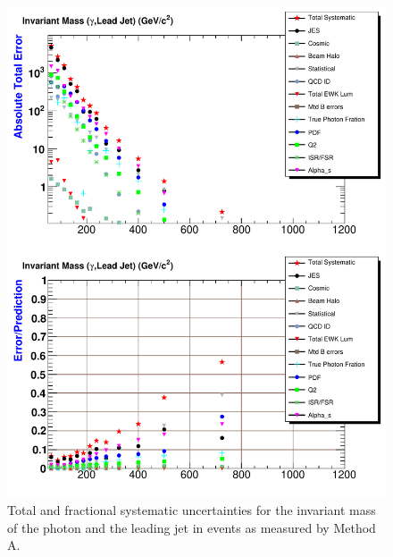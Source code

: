 \begin{figure}[p]
 \centering
 \includegraphics[scale=.7,keepaspectratio=true]{./G30Jets_Errs_MtdA_plot1_InvMass_pj1.pdf}
 \caption{Total and fractional systematic uncertainties for the invariant mass of the photon and the leading jet in \phoonejet events as measured by Method A.}
 \label{fig:g30Jets_Errs_MtdA_plot1_InvMass_pj1}
\end{figure}

